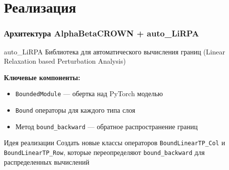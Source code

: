 
\section{Реализация}

\begin{frame}
\frametitle{Архитектура AlphaBetaCROWN + auto\_LiRPA}

\begin{block}{auto\_LiRPA}
Библиотека для автоматического вычисления границ (Linear Relaxation based Perturbation Analysis)
\end{block}

\vspace{0.3cm}

\textbf{Ключевые компоненты:}
\begin{itemize}
    \item \texttt{BoundedModule} --- обертка над PyTorch моделью
    \item \texttt{Bound} операторы для каждого типа слоя
    \item Метод \texttt{bound\_backward} --- обратное распространение границ
\end{itemize}

\vspace{0.3cm}

\begin{exampleblock}{Идея реализации}
Создать новые классы операторов \texttt{BoundLinearTP\_Col} и \texttt{BoundLinearTP\_Row}, которые переопределяют \texttt{bound\_backward} для распределенных вычислений
\end{exampleblock}

\end{frame}

